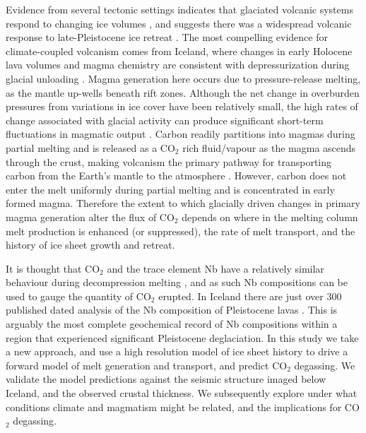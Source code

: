 \documentclass[draft,linenumbers]{agujournal2018}
\begin{document}
Evidence from several tectonic settings indicates that glaciated volcanic systems respond to changing ice volumes \citep{sigvaldason-etal-1992,jull-1996,maclennan-etal-2002,glazner-etal-1999,jellinek-etal-2004,rawson-etal-2016}, and suggests there was a widespread volcanic response to late-Pleistocene ice retreat \citep{huybers-2009}. The most compelling evidence for climate-coupled volcanism comes from Iceland, where changes in early Holocene lava volumes and magma chemistry are consistent with depressurization during glacial unloading \citep{jull-1996,maclennan-etal-2002,sinton-etal-2005}. Magma generation here occurs due to pressure-release melting, as the mantle up-wells beneath rift zones. Although the net change in overburden pressures from variations in ice cover have been relatively small, the high rates of change associated with glacial activity can produce significant short-term fluctuations in magmatic output \citep{jull-1996,pagli-2008,schmidt-etal-2013}. Carbon readily partitions into magmas during partial melting \citep{rosenthal-etal-2015} and is released as a CO$_{2}$ rich fluid/vapour as the magma ascends through the crust, making volcanism the primary pathway for transporting carbon from the Earth's mantle to the atmosphere \citep{dasgupta-2010}. However, carbon does not enter the melt uniformly during partial melting and is concentrated in early formed magma. Therefore the extent to which glacially driven changes in primary magma generation alter the flux of CO$_{2}$ depends on where in the melting column melt production is enhanced (or suppressed), the rate of melt transport, and the history of ice sheet growth and retreat.

It is thought that CO$_2$ and the trace element Nb have a relatively similar behaviour during decompression melting \citep{saal-etal-2002}, and as such Nb compositions can be used to gauge the quantity of CO$_2$ erupted. In Iceland there are just over 300 published dated analysis of the Nb composition of Pleistocene lavas \citep{gee-etal-1998,eason-etal-2015}. This is arguably the most complete geochemical record of Nb compositions within a region that experienced significant Pleistocene deglaciation. In this study we take a new approach, and use a high resolution model of ice sheet history to drive a forward model of melt generation and transport, and predict CO$_{2}$ degassing. We validate the model predictions against the seismic structure imaged below Iceland, and the observed crustal thickness. We subsequently explore under what conditions climate and magmatism might be related, and the implications for CO$_{2}$ degassing.
\end{document}

